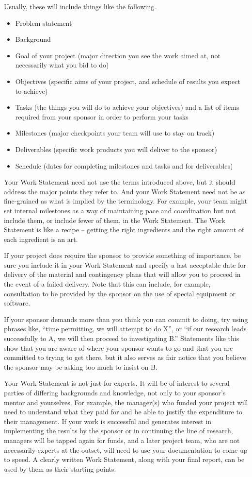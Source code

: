 \documentclass[12pt]{article}
\begin{document}
Usually, these will include things like the following. 
\begin{itemize}
\item Problem statement
\item Background
\item Goal of your project (major direction you see the work aimed at,
  not necessarily what you bid to do)
\item Objectives (specific aims of your project, and schedule of
  results you expect to achieve)
\item Tasks (the things you will do to achieve your objectives) and a list of items
required from your sponsor in order to perform your tasks
\item Milestones (major checkpoints your team will use to stay on track)
\item Deliverables (specific work products you will deliver to the sponsor)
\item Schedule (dates for completing milestones and tasks and for deliverables)
\end{itemize}
Your Work Statement need not use the terms introduced above, but it
should address the major points they refer to.  And your Work Statement
need not be as fine-grained as what is implied by the terminology. 
For example, your team might set internal milestones as a
way of maintaining pace and coordination but not include them, or
include fewer of them, in the Work Statement. The Work Statement is
like a recipe -- getting the right ingredients and the right amount of
each ingredient is an art.

If your project does require the sponsor to provide something of
importance, be sure you include it in your Work Statement and specify
a last acceptable date for delivery of the material and contingency
plans that will allow you to proceed in the event of a failed
delivery. Note that this can include, for example, consultation to be
provided by the sponsor on the use of special equipment or software.

If your sponsor demands more than you think you can commit to doing,
try using phrases like, ``time permitting, we will attempt to do X'', or
``if our research leads successfully to A, we will then proceed to
investigating B.'' Statements like this show that you are aware of
where your sponsor wants to go and that you are committed to trying to
get there, but it also serves as fair notice that you believe the
sponsor may be asking too much to insist on B.

Your Work Statement is not just for experts. It will be of interest to
several parties of differing backgrounds and knowledge, not only to
your sponsor’s mentor and yourselves. For example, the manager(s) who
funded your project will need to understand what they paid for and be
able to justify the expenditure to their management. If your work is
successful and generates interest in implementing the results by the
sponsor or in continuing the line of research, managers will be tapped
again for funds, and a later project team, who are not necessarily
experts at the outset, will need to use your documentation to come up
to speed. A clearly written Work Statement, along with your final
report, can be used by them as their starting points.


\nocite{*}

\end{document}
